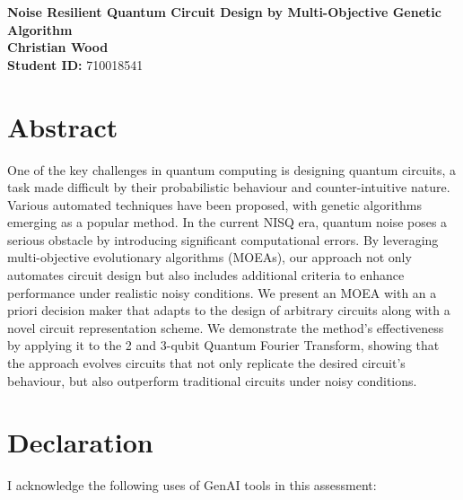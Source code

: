 \documentclass[11pt,a4paper]{article}
\begin{document}
\singlespacing %
\thispagestyle{empty} %

\begin{center}
{\bf \LARGE Noise Resilient Quantum Circuit Design by Multi-Objective Genetic Algorithm}\\[0.5cm]
  \textbf{Christian Wood} \\[0.2cm]
  \textbf{Student ID:} 710018541 \\[1cm]
\end{center}

\section*{Abstract}
\noindent 
One of the key challenges in quantum computing is designing quantum circuits, a task made difficult by their probabilistic behaviour and counter-intuitive nature. Various automated techniques have been proposed, with genetic algorithms emerging as a popular method. In the current NISQ era, quantum noise poses a serious obstacle by introducing significant computational errors. By leveraging multi-objective evolutionary algorithms (MOEAs), our approach not only automates circuit design but also includes additional criteria to enhance performance under realistic noisy conditions. We present an MOEA with an a priori decision maker that adapts to the design of arbitrary circuits along with a novel circuit representation scheme. We demonstrate the method’s effectiveness by applying it to the 2 and 3-qubit Quantum Fourier Transform, showing that the approach evolves circuits that not only replicate the desired circuit's behaviour, but also outperform traditional circuits under noisy conditions.

\newpage
\thispagestyle{empty} 
\section*{Declaration}
I acknowledge the following uses of GenAI tools in this assessment: 
\end{document}

